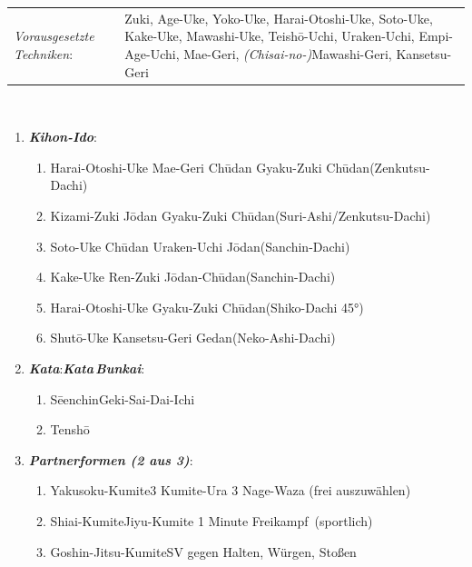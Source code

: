 \documentclass[a5paper,landscape,DIV=calc,11pt,notitlepage]{scrartcl}
\newcommand{\bull}{\,\textbullet\,}
\begin{document}
\pagebreak
\begin{tcolorbox}[colback=white,colframe=BRBELT,coltitle=white,title=3. Kyu: Braun]
	\renewcommand{\labelenumi}{\alph{enumi}.)}
	\renewcommand{\labelenumii}{\arabic*.}
	{\scriptsize 
		\begin{tabularx}{\textwidth}{lX}
			\textit{Vorausgesetzte Techniken}:& Zuki, Age-Uke, Yoko-Uke, Harai-Otoshi-Uke, Soto-Uke, Kake-Uke, Mawashi-Uke, Teish\={o}-Uchi, Uraken-Uchi, \mbox{Empi-Age-Uchi}, Mae-Geri, \textit{(Chisai-no-)}Mawashi-Geri, Kansetsu-Geri
		\end{tabularx}\\}\vspace{12pt}
	\begin{enumerate}[nosep]
		\item \textit{\textbf{Kihon-Ido}}:
		\begin{enumerate}[nosep]
			\item Harai-Otoshi-Uke\bull Mae-Geri Ch\={u}dan\bull Gyaku-Zuki Ch\={u}dan\tabto{280pt}(Zenkutsu-Dachi)
			\item Kizami-Zuki J\={o}dan\bull Gyaku-Zuki Ch\={u}dan\tabto{280pt}(Suri-Ashi/Zenkutsu-Dachi)
			\item Soto-Uke Ch\={u}dan\bull Uraken-Uchi J\={o}dan\tabto{280pt}(Sanchin-Dachi)
			\item Kake-Uke\bull Ren-Zuki J\={o}dan-Ch\={u}dan\tabto{280pt}(Sanchin-Dachi)
			\item Harai-Otoshi-Uke\bull Gyaku-Zuki Ch\={u}dan\tabto{280pt}(Shiko-Dachi 45°)
			\item Shut\={o}-Uke\bull Kansetsu-Geri Gedan\tabto{280pt}(Neko-Ashi-Dachi)
		\end{enumerate}\vspace{24pt}
		\item \textit{\textbf{Kata}}:\tabto{200pt}\textit{\textbf{Kata\,Bunkai}}:
		\begin{enumerate}[nosep]
			\item S\={e}enchin\tabto{200pt}Geki-Sai-Dai-Ichi
			\item Tensh\={o}
		\end{enumerate}\vspace{24pt}
		\item \textit{\textbf{Partnerformen (2 aus 3)}}:
		\begin{enumerate}[nosep]
			\item Yakusoku-Kumite\tabto{200pt}3 Kumite-Ura\bull 3 Nage-Waza (frei auszuwählen)
			\item Shiai-Kumite\tabto{200pt}Jiyu-Kumite 1 Minute \frqq Freikampf\flqq~(sportlich)
			\item Goshin-Jitsu-Kumite\tabto{200pt}SV gegen Halten, Würgen, Stoßen
		\end{enumerate}
	\end{enumerate}
\end{tcolorbox}
\end{document}
